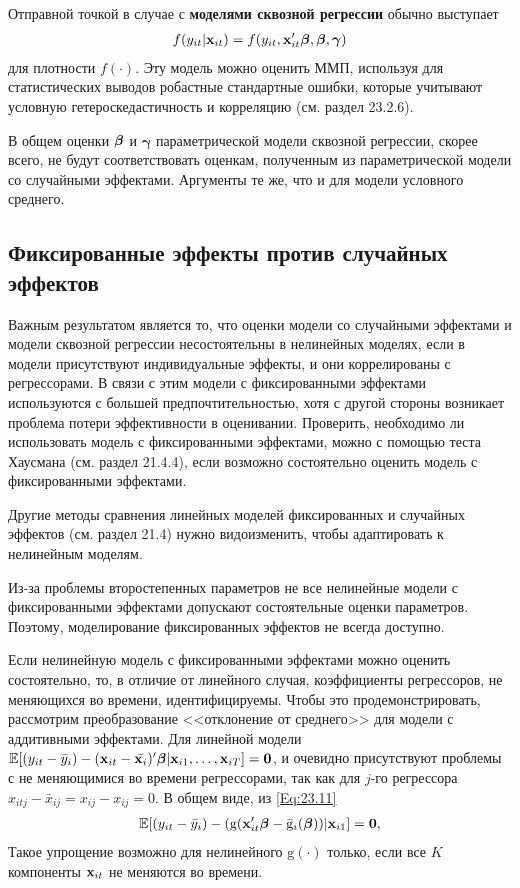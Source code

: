 Отправной точкой в случае с \textbf{моделями сквозной регрессии} обычно выступает
\begin{align}
f(y_{it}|\mathbf{x}_{it})=f(y_{it}, \mathbf{x}'_{it}\bm{\beta}, \bm{\beta}, \bm\gamma)
\label{Eq:23.23}
\end{align}
для плотности $f(\cdot)$. Эту модель можно оценить ММП, используя для статистических выводов робастные стандартные ошибки, которые учитывают условную гетероскедастичность и корреляцию (см. раздел 23.2.6).

В общем оценки $\bm{\beta}$ и $\bm\gamma$ параметрической модели сквозной регрессии, скорее всего, не будут соответствовать оценкам, полученным из параметрической модели со случайными эффектами. Аргументы те же, что и для модели условного среднего.

\subsection{Фиксированные эффекты против случайных эффектов}

Важным результатом является то, что оценки модели со случайными эффектами и модели сквозной регрессии несостоятельны в нелинейных моделях, если в модели присутствуют индивидуальные эффекты, и они коррелированы с регрессорами. В связи с этим модели с фиксированными эффектами используются с большей предпочтительностью, хотя с другой стороны возникает проблема потери эффективности в оценивании. Проверить, необходимо ли использовать модель с фиксированными эффектами, можно с помощью теста Хаусмана (см. раздел 21.4.4), если возможно состоятельно оценить модель с фиксированными эффектами.

Другие методы сравнения линейных моделей фиксированных и случайных эффектов  (см. раздел 21.4) нужно видоизменить, чтобы адаптировать к нелинейным моделям.

Из-за проблемы второстепенных параметров не все нелинейные модели с фиксированными эффектами допускают состоятельные оценки параметров. Поэтому, моделирование фиксированных эффектов не всегда доступно.

Если нелинейную модель с фиксированными эффектами можно оценить состоятельно, то, в отличие от линейного случая, коэффициенты регрессоров, не меняющихся во времени, идентифицируемы. Чтобы это продемонстрировать, рассмотрим преобразование <<отклонение от среднего>> для модели с аддитивными эффектами. Для линейной модели $\mathbb{E}[(y_{it}-\bar{y}_i)-(\mathbf{x}_{it}-\bar{\mathbf{x}_i})'\bm{\beta}|\mathbf{x}_{i1},\dots,\mathbf{x}_{iT}]=\mathbf{0}$, и очевидно присутствуют проблемы с не меняющимися во времени регрессорами, так как для $j$-го регрессора  $x_{itj}-\bar{x}_{ij}=x_{ij}-x_{ij}=0$. В общем виде, из \ref{Eq:23.11}
\begin{align}
\mathbb{E}[(y_{it}-\bar{y}_i)-(\mathrm g(\mathbf{x}'_{it}\bm{\beta}-\bar{\mathrm{g}}_i(\bm{\beta}))|\mathbf{x}_{i1}]=\mathbf{0},
\nonumber
\end{align}
Такое упрощение возможно для нелинейного $\mathrm g(\cdot)$ только, если все $K$ компоненты $\mathbf{x}_{it}$ не меняются во времени.

